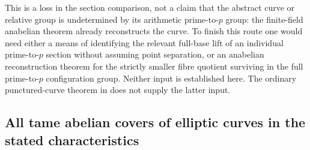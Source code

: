 This is a loss in the section comparison, not a claim that the
abstract curve or relative group is undetermined by its arithmetic
prime-to-$p$ group: the finite-field anabelian theorem already
reconstructs the curve. To finish this route one would need either
a means of identifying the relevant full-base lift of an individual
prime-to-$p$ section without assuming point separation, or an
anabelian reconstruction theorem for the strictly smaller fibre
quotient surviving in the full prime-to-$p$ configuration group.
Neither input is established here. The ordinary punctured-curve
theorem in \citet[Corollary 3.10]{A_SaidiTamagawa2009} does not
supply the latter input.

\subsection{All tame abelian covers of elliptic curves in the stated characteristics}


